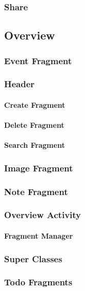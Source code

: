 	\subsubsection{Share}
\subsection{Overview}
	\subsubsection{Event Fragment}
	\subsubsection{Header}
		\paragraph{Create Fragment}
		\paragraph{Delete Fragment}
		\paragraph{Search Fragment}
	\subsubsection{Image Fragment}
	\subsubsection{Note Fragment}
	\subsubsection{Overview Activity}
		\paragraph{Fragment Manager}
	\subsubsection{Super Classes}
	\subsubsection{Todo Fragments}